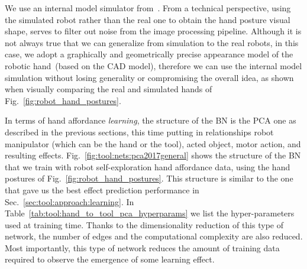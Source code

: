 We use an internal model simulator from~\cite{vicente:2016:jint}.
From a technical perspective, using the simulated robot rather than the real one to obtain the hand posture visual shape, serves to filter out noise from the image processing pipeline.
Although it is not always true that we can generalize from simulation to the real robots, in this case, we adopt a graphically and geometrically precise appearance model of the robotic hand~(based on the CAD model),
therefore we can use the internal model simulation without losing generality or compromising the overall idea, as shown when visually comparing the real and simulated hands of Fig.~\ref{fig:robot_hand_postures}.

In terms of hand affordance \emph{learning}, the structure of the \ac{BN} is the \ac{PCA} one as described in the previous sections, this time putting in relationships robot manipulator (which can be the hand or the tool), acted object, motor action, and resulting effects.
Fig.~\ref{fig:tool:nets:pca2017general} shows the structure of the \ac{BN} that we train with robot self-exploration hand affordance data, using the hand postures of Fig.~\ref{fig:robot_hand_postures}.
This structure is similar to the one that gave us the best effect prediction performance in Sec.~\ref{sec:tool:approach:learning}.
In Table~\ref{tab:tool:hand_to_tool_pca_hyperparams} we list the hyper-parameters used at training time.
Thanks to the dimensionality reduction of this type of network, the number of edges and the computational complexity are also reduced.
Most importantly, this type of network reduces the amount of training data required to observe the emergence of some learning effect.

